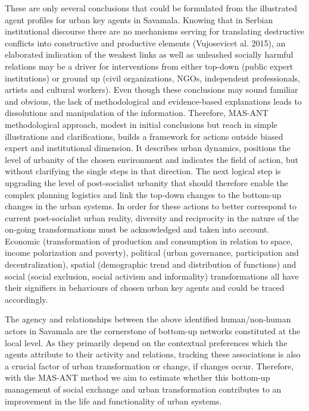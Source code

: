 \documentclass[11pt]{report}
\begin{document}
These are only several conclusions that could be formulated from the illustrated agent profiles for urban key agents in Savamala. Knowing that in Serbian institutional discourse there are no mechanisms serving for translating destructive conflicts into constructive and productive elements (Vujosevicet al. 2015), an elaborated indication of the weakest links as well as unleashed socially harmful relations may be a driver for interventions from either top-down (public expert institutions) or ground up (civil organizations, NGOs, independent professionals, artists and cultural workers). Even though these conclusions may sound familiar and obvious, the lack of methodological and evidence-based explanations leads to dissolutions and manipulation of the information. Therefore, MAS-ANT methodological approach, modest in initial conclusions but reach in simple illustrations and clarifications, builds a framework for actions outside biased expert and institutional dimension. It describes urban dynamics, positions the level of urbanity of the chosen environment and indicates the field of action, but without clarifying the single steps in that direction. The next logical step is upgrading the level of post-socialist urbanity that should therefore enable the complex planning logistics and link the top-down changes to the bottom-up changes in the urban systems. In order for these actions to better correspond to current post-socialist urban reality, diversity and reciprocity in the nature of the on-going transformations must be acknowledged and taken into account. Economic (transformation of production and consumption in relation to space, income polarization and poverty), political (urban governance, participation and decentralization), spatial (demographic trend and distribution of functions) and social (social exclusion, social activism and informality) transformations all have their signifiers in behaviours of chosen urban key agents and could be traced accordingly.

The agency and relationships between the above identified human/non-human actors in Savamala are the cornerstone of bottom-up networks constituted at the local level. As they primarily depend on the contextual preferences which the agents attribute to their activity and relations, tracking these associations is also a crucial factor of urban transformation or change, if changes occur. Therefore, with the MAS-ANT method we aim to estimate whether this bottom-up management of social exchange and urban transformation contributes to an improvement in the life and functionality of urban systems.
\end{document}
